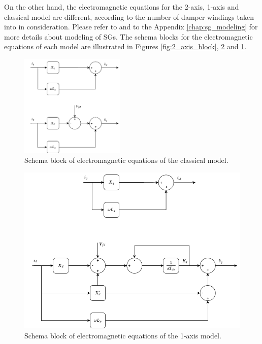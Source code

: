 On the other hand, the electromagnetic equations for the 2-axis, 1-axis and
classical model are different, according to the number of damper windings taken
into in consideration. Please refer to \cite{sauer2017power} and to the Appendix
\ref{chap:sg_modeling} for more details about modeling of SGs. The schema blocks
for the electromagnetic equations of each model are illustrated in Figures
\ref{fig:2_axis_block}, \ref{fig:1_axis_block} and \ref{fig:classical_block}.

\begin{figure}[ht!]
    \centering
    \includegraphics[width=5cm]{images/classical_block.png}
    \caption{Schema block of electromagnetic equations of the classical model.}
    \label{fig:classical_block}
\end{figure}

\newpage
\begin{figure}[ht!]
    \centering
    \includegraphics[width=12cm]{images/1_axis_block.png}
    \caption{Schema block of electromagnetic equations of the 1-axis model.}
    \label{fig:1_axis_block}
\end{figure}

